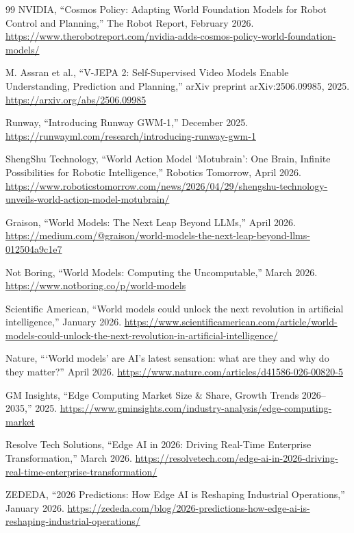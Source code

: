 \documentclass[11pt,a4paper]{ltjsarticle}
\begin{document}
\begin{thebibliography}{99}
NVIDIA,
``Cosmos Policy: Adapting World Foundation Models for Robot Control and Planning,''
The Robot Report, February 2026.
\url{https://www.therobotreport.com/nvidia-adds-cosmos-policy-world-foundation-models/}

M. Assran et al.,
``V-JEPA 2: Self-Supervised Video Models Enable Understanding, Prediction and Planning,''
arXiv preprint arXiv:2506.09985, 2025.
\url{https://arxiv.org/abs/2506.09985}

Runway,
``Introducing Runway GWM-1,''
December 2025.
\url{https://runwayml.com/research/introducing-runway-gwm-1}

ShengShu Technology,
``World Action Model `Motubrain': One Brain, Infinite Possibilities for Robotic Intelligence,''
Robotics Tomorrow, April 2026.
\url{https://www.roboticstomorrow.com/news/2026/04/29/shengshu-technology-unveils-world-action-model-motubrain/}

Graison,
``World Models: The Next Leap Beyond LLMs,''
April 2026.
\url{https://medium.com/@graison/world-models-the-next-leap-beyond-llms-012504a9c1e7}

Not Boring,
``World Models: Computing the Uncomputable,''
March 2026.
\url{https://www.notboring.co/p/world-models}

Scientific American,
``World models could unlock the next revolution in artificial intelligence,''
January 2026.
\url{https://www.scientificamerican.com/article/world-models-could-unlock-the-next-revolution-in-artificial-intelligence/}

Nature,
```World models' are AI's latest sensation: what are they and why do they matter?''
April 2026.
\url{https://www.nature.com/articles/d41586-026-00820-5}

GM Insights,
``Edge Computing Market Size \& Share, Growth Trends 2026--2035,''
2025.
\url{https://www.gminsights.com/industry-analysis/edge-computing-market}

Resolve Tech Solutions,
``Edge AI in 2026: Driving Real-Time Enterprise Transformation,''
March 2026.
\url{https://resolvetech.com/edge-ai-in-2026-driving-real-time-enterprise-transformation/}

ZEDEDA,
``2026 Predictions: How Edge AI is Reshaping Industrial Operations,''
January 2026.
\url{https://zededa.com/blog/2026-predictions-how-edge-ai-is-reshaping-industrial-operations/}


\end{thebibliography}
\end{document}
